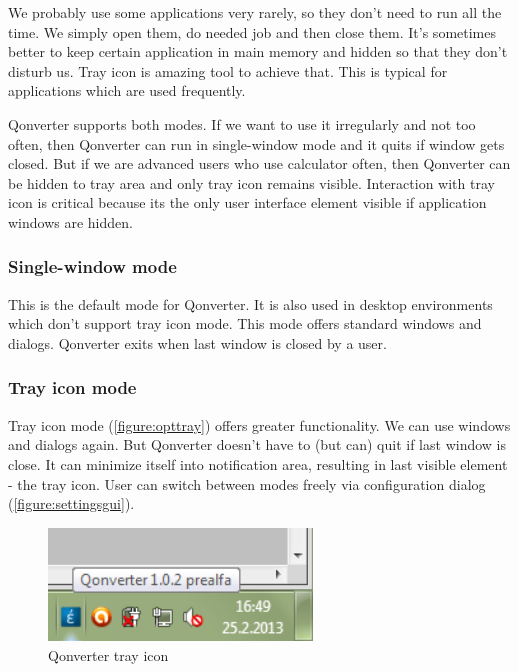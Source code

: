 We probably use some applications very rarely, so they don't need to run all the time. We simply open them, do needed job and then close them. It's sometimes better to keep certain application in main memory and hidden so that they don't disturb us. Tray icon is amazing tool to achieve that. This is typical for applications which are used frequently.

Qonverter supports both modes. If we want to use it irregularly and not too often, then Qonverter can run in single-window mode and it quits if window gets closed. But if we are advanced users who use calculator often, then Qonverter can be hidden to tray area and only tray icon remains visible. Interaction with tray icon is critical because its the only user interface element visible if application windows are hidden.

\subsubsection{Single-window mode}
This is the default mode for Qonverter. It is also used in desktop environments which don't support tray icon mode. This mode offers standard windows and dialogs. Qonverter exits when last window is closed by a user.

\subsubsection{Tray icon mode}
Tray icon mode (\autoref{figure:opttray}) offers greater functionality. We can use windows and dialogs again. But Qonverter doesn't have to (but can) quit if last window is close. It can minimize itself into notification area, resulting in last visible element - the tray icon. User can switch between modes freely via configuration dialog (\autoref{figure:settingsgui}).

\begin{figure}[ht]
\begin{center}
\includegraphics[width=7cm]{graphics/real-world/01-tray.png}
\caption{Qonverter tray icon}\label{figure:opttray}
\end{center}
\end{figure}

